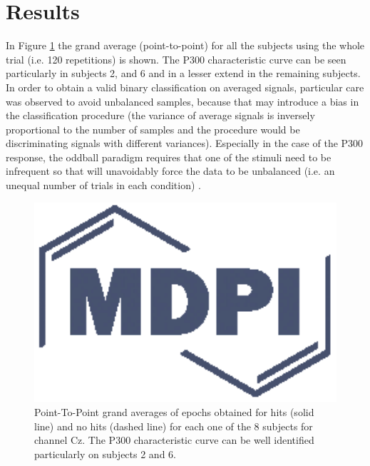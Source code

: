 \documentclass[entropy,article,submit,moreauthors,pdftex,10pt,a4paper]{mdpi}
\begin{document}

\section{Results}
\label{section:results}
In Figure \ref{fig:subjectaveraged} the grand average (point-to-point) for all the subjects using the whole trial (i.e. 120 repetitions) is shown.  The P300 characteristic curve can be seen particularly in subjects 2, and 6 and in a lesser extend in the remaining subjects. In order to obtain a valid binary classification on averaged signals, particular care was observed to avoid unbalanced samples, because that may introduce a bias in the classification procedure (the variance of average signals is inversely proportional to the number of samples and the procedure would be discriminating signals with different variances). Especially in the case of the P300 response, the oddball paradigm requires that one of the stimuli need to be infrequent so that will unavoidably force the data to be unbalanced (i.e. an unequal number of trials in each condition) \citep{Tibon2015}.


\begin{figure}[H]
\centering
\includegraphics[width=16cm]{subjectaveraged.eps}
\caption{Point-To-Point grand averages of epochs obtained for hits (solid line) and no hits (dashed line) for each one of the 8 subjects for channel Cz. The P300 characteristic curve can be well identified particularly on subjects 2 and 6.}
\label{fig:subjectaveraged}
\end{figure}
\end{document}
